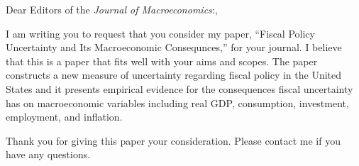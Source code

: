 \documentclass[12pt]{article}
\begin{document}
Dear Editors of the \textit{Journal of Macroeconomics}:, 

I am writing you to request that you consider my paper, ``Fiscal Policy Uncertainty and Its Macroeconomic Consequnces,'' for your journal.  I believe that this is a paper that fits well with your aims and scopes.  The paper constructs a new measure of uncertainty regarding fiscal policy in the United States and it presents empirical evidence for the consequences fiscal uncertainty has on macroeconomic variables including real GDP, consumption, investment, employment, and inflation.

Thank you for giving this paper your consideration.  Please contact me if you have any questions. 
\end{document}
